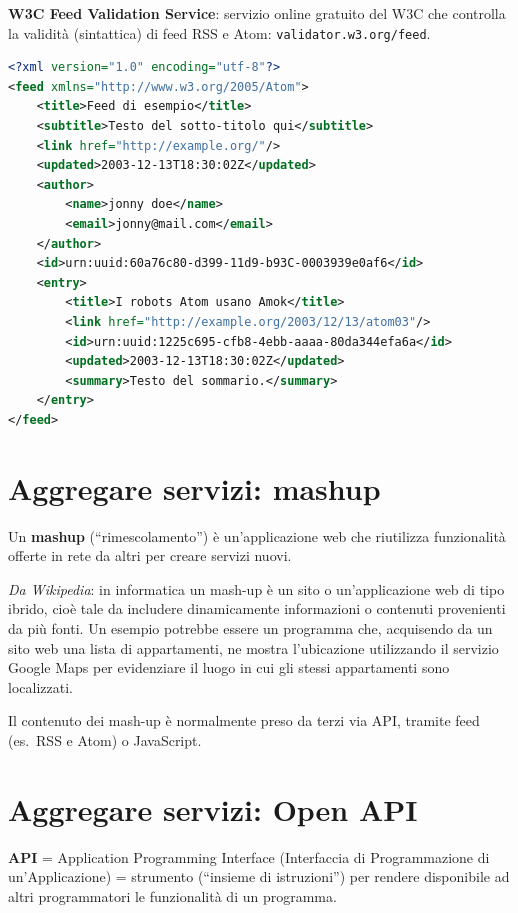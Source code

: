 \textbf{W3C Feed Validation Service}: servizio online gratuito del W3C che controlla la validità (sintattica) di feed RSS e Atom: \texttt{validator.w3.org/feed}.

\begin{lstlisting}[language=XML, caption=Esempio di Atom feed]
<?xml version="1.0" encoding="utf-8"?>
<feed xmlns="http://www.w3.org/2005/Atom">
    <title>Feed di esempio</title>
    <subtitle>Testo del sotto-titolo qui</subtitle>
    <link href="http://example.org/"/>
    <updated>2003-12-13T18:30:02Z</updated>
    <author>
        <name>jonny doe</name>
        <email>jonny@mail.com</email>
    </author>
    <id>urn:uuid:60a76c80-d399-11d9-b93C-0003939e0af6</id>
    <entry>
        <title>I robots Atom usano Amok</title>
        <link href="http://example.org/2003/12/13/atom03"/>
        <id>urn:uuid:1225c695-cfb8-4ebb-aaaa-80da344efa6a</id>
        <updated>2003-12-13T18:30:02Z</updated>
        <summary>Testo del sommario.</summary>
    </entry>
</feed>
\end{lstlisting}

\section{Aggregare servizi: mashup}

Un \textbf{mashup} (``rimescolamento'') è un'applicazione web che riutilizza funzionalità offerte in rete da altri per creare servizi nuovi.

\textit{Da Wikipedia}: in informatica un mash-up è un sito o un'applicazione web di tipo ibrido, cioè tale da includere dinamicamente informazioni o contenuti provenienti da più fonti. Un esempio potrebbe essere un programma che, acquisendo da un sito web una lista di appartamenti, ne mostra l'ubicazione utilizzando il servizio Google Maps per evidenziare il luogo in cui gli stessi appartamenti sono localizzati.

Il contenuto dei mash-up è normalmente preso da terzi via API, tramite feed (es.\ RSS e Atom) o JavaScript.

\section{Aggregare servizi: Open API}

\textbf{API} = Application Programming Interface (Interfaccia di Programmazione di un'Applicazione) = strumento (``insieme di istruzioni'') per rendere disponibile ad altri programmatori le funzionalità di un programma.

